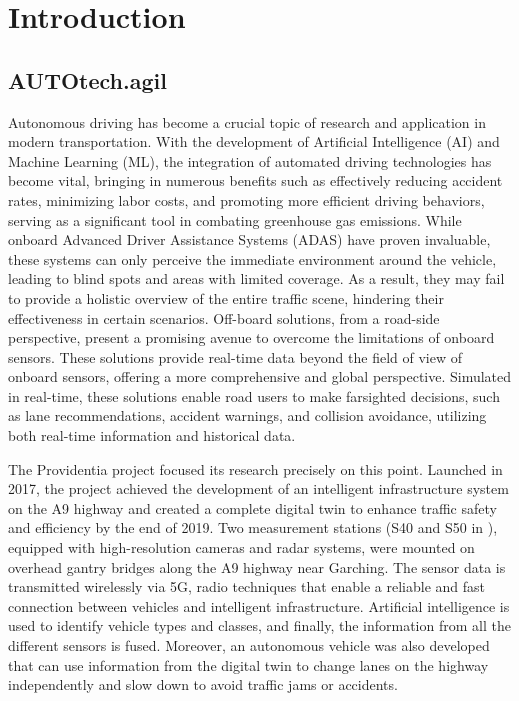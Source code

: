 \chapter{Introduction} \label{chap:one}%

\section{AUTOtech.agil} 

Autonomous driving has become a crucial topic of research and application in modern transportation. With the development of Artificial Intelligence (AI) and Machine Learning (ML), the integration of automated driving technologies has become vital, bringing in numerous benefits such as effectively reducing accident rates, minimizing labor costs, and promoting more efficient driving behaviors, serving as a significant tool in combating greenhouse gas emissions. While onboard Advanced Driver Assistance Systems (ADAS) have proven invaluable, these systems can only perceive the immediate environment around the vehicle, leading to blind spots and areas with limited coverage. As a result, they may fail to provide a holistic overview of the entire traffic scene, hindering their effectiveness in certain scenarios. Off-board solutions, from a road-side perspective, present a promising avenue to overcome the limitations of onboard sensors. These solutions provide real-time data beyond the field of view of onboard sensors, offering a more comprehensive and global perspective. Simulated in real-time, these solutions enable road users to make farsighted decisions, such as lane recommendations, accident warnings, and collision avoidance, utilizing both real-time information and historical data.

The Providentia project focused its research precisely on this point. Launched in 2017, the project achieved the development of an intelligent infrastructure system on the A9 highway and created a complete digital twin to enhance traffic safety and efficiency by the end of 2019. Two measurement stations (S40 and S50 in ), equipped with high-resolution cameras and radar systems, were mounted on overhead gantry bridges along the A9 highway near Garching. The sensor data is transmitted wirelessly via 5G, radio techniques that enable a reliable and fast connection between vehicles and intelligent infrastructure. Artificial intelligence is used to identify vehicle types and classes, and finally, the information from all the different sensors is fused. Moreover, an autonomous vehicle was also developed that can use information from the digital twin to change lanes on the highway independently and slow down to avoid traffic jams or accidents.

